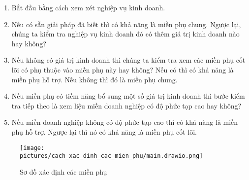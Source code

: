 \begin{enumerate}

    \item Bắt đầu bằng cách xem xét nghiệp vụ kinh doanh.

    \item Nếu có sẵn giải pháp đã biết thì có khả năng là miền phụ chung. Ngược lại, chúng ta kiểm tra nghiệp vụ kinh doanh đó có thêm giá trị kinh doanh nào hay không?

    \item Nếu không có giá trị kinh doanh thì chúng ta kiểm tra xem các miền phụ cốt lõi có phụ thuộc vào miền phụ này hay không? Nếu có thì có khả năng là miền phụ hỗ trợ. Nếu không thì đó là miền phụ chung.

    \item Nếu miền phụ có tiềm năng bổ sung một số giá trị kinh doanh thì bước kiểm tra tiếp theo là xem liệu miền doanh nghiệp có độ phức tạp cao hay không?

    \item Nếu miền doanh nghiệp không có độ phức tạp cao thì có khả năng là miền phụ hỗ trợ. Ngược lại thì nó có khả năng là miền phụ cốt lõi.

\end{enumerate}

\begin{figure}[h]

    \centering

    \texttt{[image: pictures/cach\_xac\_dinh\_cac\_mien\_phu/main.drawio.png]}

    \caption{Sơ đồ xác định các miền phụ}

\end{figure}










